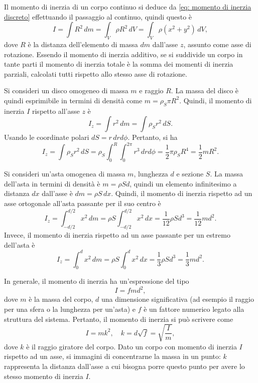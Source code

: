Il momento di inerzia di un corpo continuo si deduce da \eqref{eq: momento di inerzia discreto} effettuando il passaggio al continuo, quindi questo è
\begin{equation}
    I=\int R^2\,dm=\int_V\rho R^2\,dV=\int_V\rho(x^2+y^2)\,dV,
\end{equation}
dove $R$ è la distanza dell'elemento di massa $dm$ dall'asse $z$, assunto come asse di rotazione. Essendo il momento di inerzia additivo, se si suddivide un corpo in tante parti il momento di inerzia totale è la somma dei momenti di inerzia parziali, calcolati tutti rispetto allo stesso asse di rotazione. 
\begin{ex}
    Si consideri un disco omogeneo di massa $m$ e raggio $R$. La massa del disco è quindi esprimibile in termini di densità come $m=\rho_S\pi R^2$. Quindi, il momento di inerzia $I$ rispetto all'asse $z$ è
    \begin{equation}
        I_z=\int r^2\,dm=\int\rho_S r^2\,dS.
    \end{equation}
    Usando le coordinate polari $dS=r\,drd\phi$. Pertanto, si ha
    \begin{equation}
        I_z=\int\rho_S r^2\,dS=\rho_S\int_0^R\int_0^{2\pi}r^3\,drd\phi=\frac{1}{2}\pi\rho_SR^4=\frac{1}{2}mR^2.
    \end{equation}
\end{ex}
\begin{ex}
    Si consideri un'asta omogenea di massa $m$, lunghezza $d$ e sezione $S$. La massa dell'asta in termini di densità è $m=\rho Sd$, quindi un elemento infinitesimo a distanza $dx$ dall'asse è $dm=\rho S\,dx$. Quindi, il momento di inerzia rispetto ad un asse ortogonale all'asta passante per il suo centro è
    \begin{equation}
        I_z=\int_{-d/2}^{d/2}x^2\,dm=\rho S\int_{-d/2}^{d/2}x^2\,dx=\frac{1}{12}\rho Sd^3=\frac{1}{12}md^2.
    \end{equation}
    Invece, il momento di inerzia rispetto ad un asse passante per un estremo dell'asta è
    \begin{equation}
        I_z=\int_0^dx^2\,dm=\rho S\int_0^dx^2\,dx=\frac{1}{3}\rho Sd^3=\frac{1}{3}md^2.
    \end{equation}
\end{ex}
In generale, il momento di inerzia ha un'espressione del tipo 
\begin{equation}
    I=fmd^2,
\end{equation}
dove $m$ è la massa del corpo, $d$ una dimensione significativa (ad esempio il raggio per una sfera o la lunghezza per un'asta) e $f$ è un fattore numerico legato alla struttura del sistema. Pertanto, il momento di inerzia si può scrivere come
\begin{equation}
    I=mk^2,\quad k=d\sqrt{f}=\sqrt{\frac{I}{m}},
\end{equation}
dove $k$ è il raggio giratore del corpo. Dato un corpo con momento di inerzia $I$ rispetto ad un asse, si immagini di concentrarne la massa in un punto: $k$ rappresenta la distanza dall'asse a cui bisogna porre questo punto per avere lo stesso momento di inerzia $I$.

